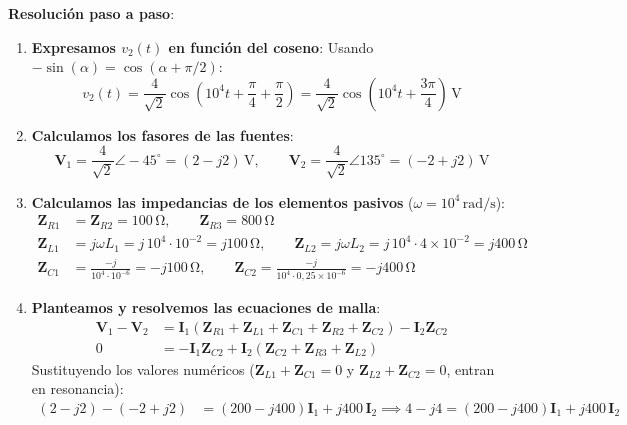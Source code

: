 \begin{ejercicio}
\textbf{Resolución paso a paso}:
\begin{enumerate}
    \item \textbf{Expresamos $v_2(t)$ en función del coseno}: Usando $-\sin(\alpha) = \cos(\alpha + \pi/2)$:
    \begin{equation*}
        v_2(t) = \frac{4}{\sqrt{2}}\cos\left(10^4 t + \frac{\pi}{4} + \frac{\pi}{2}\right) = \frac{4}{\sqrt{2}}\cos\left(10^4 t + \frac{3\pi}{4}\right)\,\si{\volt}
    \end{equation*}
    \item \textbf{Calculamos los fasores de las fuentes}:
    \begin{equation*}
        \mathbf{V}_1 = \frac{4}{\sqrt{2}}\angle -45^\circ = (2 - j 2)\,\si{\volt}, \qquad \mathbf{V}_2 = \frac{4}{\sqrt{2}}\angle 135^\circ = (-2 + j 2)\,\si{\volt}
    \end{equation*}
    \item \textbf{Calculamos las impedancias de los elementos pasivos} ($\omega = 10^4\,\si{\radian/\second}$):
    \begin{align*}
        \mathbf{Z}_{R1} &= \mathbf{Z}_{R2} = 100\,\si{\ohm}, \qquad \mathbf{Z}_{R3} = 800\,\si{\ohm} \\
        \mathbf{Z}_{L1} &= j\omega L_1 = j\,10^4\cdot 10^{-2} = j 100\,\si{\ohm}, \qquad \mathbf{Z}_{L2} = j\omega L_2 = j\,10^4\cdot 4\times 10^{-2} = j 400\,\si{\ohm} \\
        \mathbf{Z}_{C1} &= \frac{-j}{10^4 \cdot 10^{-6}} = -j 100\,\si{\ohm}, \qquad \mathbf{Z}_{C2} = \frac{-j}{10^4 \cdot 0{,}25\times 10^{-6}} = -j 400\,\si{\ohm}
    \end{align*}
    \item \textbf{Planteamos y resolvemos las ecuaciones de malla}:
    \begin{align*}
        \mathbf{V}_1 - \mathbf{V}_2 &= \mathbf{I}_1(\mathbf{Z}_{R1} + \mathbf{Z}_{L1} + \mathbf{Z}_{C1} + \mathbf{Z}_{R2} + \mathbf{Z}_{C2}) - \mathbf{I}_2 \mathbf{Z}_{C2} \\
        0 &= -\mathbf{I}_1 \mathbf{Z}_{C2} + \mathbf{I}_2(\mathbf{Z}_{C2} + \mathbf{Z}_{R3} + \mathbf{Z}_{L2})
    \end{align*}
    Sustituyendo los valores numéricos ($\mathbf{Z}_{L1} + \mathbf{Z}_{C1} = 0$ y $\mathbf{Z}_{L2} + \mathbf{Z}_{C2} = 0$, entran en resonancia):
    \begin{align*}
        (2 - j 2) - (-2 + j 2) &= (200 - j 400)\mathbf{I}_1 + j 400\,\mathbf{I}_2 \implies 4 - j 4 = (200 - j 400)\mathbf{I}_1 + j 400\,\mathbf{I}_2 \\

\end{align*}
\end{enumerate}
\end{ejercicio}
